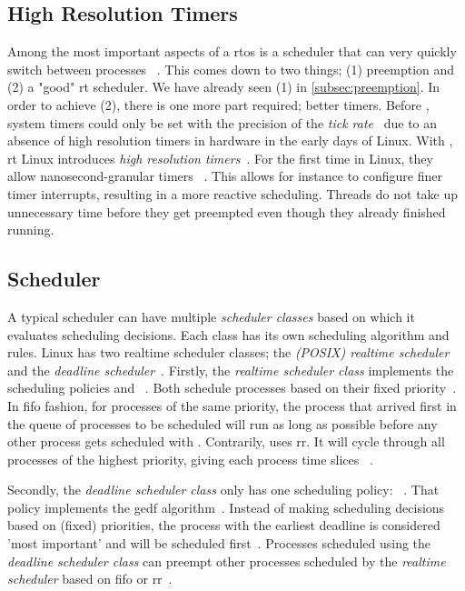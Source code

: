 \documentclass[10pt,twocolumn,a4paper]{article}
\begin{document}
\subsection{High Resolution Timers}\label{subsec:hr-timers}
Among the most important aspects of a \acrshort{rtos} is a scheduler that can very quickly switch between processes ~\cite{reghenzani_realtime_2019}.
This comes down to two things; (1) preemption and (2) a "good" \acrshort{rt} scheduler.
We have already seen (1) in \autoref{subsec:preemption}.
In order to achieve (2), there is one more part required; better timers.
Before , system timers could only be set with the precision of the \emph{tick rate}~\cite{reghenzani_realtime_2019} due to an absence of high resolution timers in hardware in the early days of Linux.
With , \acrshort{rt} Linux introduces \emph{high resolution timers}~\cite{lf:timers}.
For the first time in Linux, they allow nanosecond-granular timers ~\cite{reghenzani_realtime_2019}.
This allows for instance to configure finer timer interrupts, resulting in a more reactive scheduling.
Threads do not take up unnecessary time before they get preempted even though they already finished running.

\subsection{Scheduler}\label{subsec:scheduler}
A typical scheduler can have multiple \emph{scheduler classes} based on which it evaluates scheduling decisions.
Each class has its own scheduling algorithm and rules.
Linux has two realtime scheduler classes; the \emph{(POSIX) realtime scheduler} and the \emph{deadline scheduler}~\cite{bristot_de_oliveira_deadline_2018}.
Firstly, the \emph{realtime scheduler class} implements the scheduling policies  and ~\cite{lf:scheduler}.
Both schedule processes based on their fixed priority~\cite{lf:scheduler,de_oliveira_timing_2016}.
In \acrfull{fifo} fashion, for processes of the same priority, the process that arrived first in the queue of processes to be scheduled will run as long as possible before any other process gets scheduled with .
Contrarily,  uses \acrfull{rr}.
It will cycle through all processes of the highest priority, giving each process time slices ~\cite{bristot_de_oliveira_deadline_2018}.

Secondly, the \emph{deadline scheduler class} only has one scheduling policy: ~\cite{bristot_de_oliveira_deadline_2018}.
That policy implements the \acrfull{gedf} algorithm~\cite{lelli_deadline_2016}.
Instead of making scheduling decisions based on (fixed) priorities, the process with the earliest deadline is considered 'most important' and will be scheduled first~\cite{bristot_de_oliveira_deadline_2018}.
Processes scheduled using the \emph{deadline scheduler class} can preempt other processes scheduled by the \emph{realtime scheduler} based on \acrshort{fifo} or \acrshort{rr}~\cite{lf:scheduler}.
\end{document}
